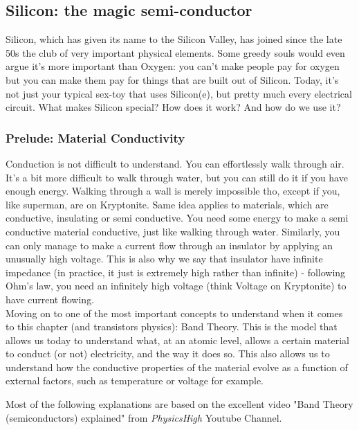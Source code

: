 \subsection{Silicon: the magic semi-conductor}

Silicon, which has given its name to the Silicon Valley, has joined since the late 50s the club of very important physical elements. Some greedy souls would even argue it's more important than Oxygen: you can't make people pay for oxygen but you can make them pay for things that are built out of Silicon. Today, it's not just your typical sex-toy that uses Silicon(e), but pretty much every electrical circuit. What makes Silicon special? How does it work? And how do we use it? 

\subsubsection{Prelude: Material Conductivity}

Conduction is not difficult to understand. You can effortlessly walk through air. It's a bit more difficult to walk through water, but you can still do it if you have enough energy. Walking through a wall is merely impossible tho, except if you, like superman, are on Kryptonite. Same idea applies to materials, which are conductive, insulating or semi conductive. You need some energy to make a semi conductive material conductive, just like walking through water. Similarly, you can only manage to make a current flow through an insulator by applying an unusually high voltage. This is also why we say that insulator have infinite impedance (in practice, it just is extremely high rather than infinite) - following Ohm's law, you need an infinitely high voltage (think Voltage on Kryptonite) to have current flowing. \\

Moving on to one of the most important concepts to understand when it comes to this chapter (and transistors physics): Band Theory. This is the model that allows us today to understand what, at an atomic level, allows a certain material to conduct (or not) electricity, and the way it does so. This also allows us to understand how the conductive properties of the material evolve as a function of external factors, such as temperature or voltage for example. 

Most of the following explanations are based on the excellent video "Band Theory (semiconductors) explained" from \textit{PhysicsHigh} Youtube Channel. 

